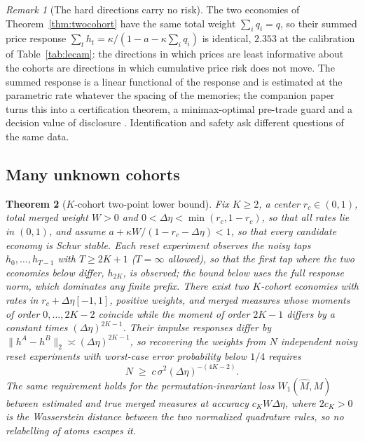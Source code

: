 \documentclass[12pt]{article}
\newtheorem{theorem}{Theorem}[section]
\theoremstyle{definition}
\theoremstyle{remark}
\newtheorem{remark}[theorem]{Remark}
\begin{document}
\begin{remark}[The hard directions carry no risk]\label{rem:riskneutral}
The two economies of Theorem~\ref{thm:twocohort} have the same total weight $\sum_iq_i=q$, so their summed price response $\sum_th_t=\kappa/(1-a-\kappa\sum_iq_i)$ is identical, $2.353$ at the calibration of Table~\ref{tab:lecam}: the directions in which prices are least informative about the cohorts are directions in which cumulative price risk does not move. The summed response is a linear functional of the response and is estimated at the parametric rate whatever the spacing of the memories; the companion paper turns this into a certification theorem, a minimax-optimal pre-trade guard and a decision value of disclosure \citep{niroula2026b}. Identification and safety ask different questions of the same data.
\end{remark}

\subsection{Many unknown cohorts}

\begin{theorem}[$K$-cohort two-point lower bound]\label{thm:kcohort}
Fix $K\ge2$, a center $r_c\in(0,1)$, total merged weight $W>0$ and $0<\Delta\eta<\min(r_c,1-r_c)$, so that all rates lie in $(0,1)$, and assume $a+\kappa W/(1-r_c-\Delta\eta)<1$, so that every candidate economy is Schur stable. Each reset experiment observes the noisy taps $h_0,\ldots,h_{T-1}$ with $T\ge2K+1$ ($T=\infty$ allowed), so that the first tap where the two economies below differ, $h_{2K}$, is observed; the bound below uses the full response norm, which dominates any finite prefix. There exist two $K$-cohort economies with rates in $r_c+\Delta\eta[-1,1]$, positive weights, and merged measures whose moments of order $0,\ldots,2K-2$ coincide while the moment of order $2K-1$ differs by a constant times $(\Delta\eta)^{2K-1}$. Their impulse responses differ by $\|h^A-h^B\|_2\asymp(\Delta\eta)^{2K-1}$, so recovering the weights from $N$ independent noisy reset experiments with worst-case error probability below $1/4$ requires
\[
N\;\ge\;c\,\sigma^2(\Delta\eta)^{-(4K-2)} .
\]
The same requirement holds for the permutation-invariant loss $W_1(\hat M,M)$ between estimated and true merged measures at accuracy $c_KW\Delta\eta$, where $2c_K>0$ is the Wasserstein distance between the two normalized quadrature rules, so no relabelling of atoms escapes it.
\end{theorem}
\end{document}
